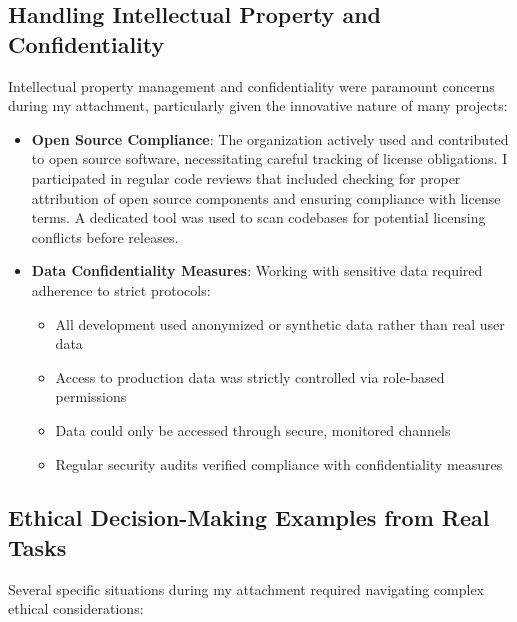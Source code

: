\documentclass[12pt,a4paper]{article}
\begin{document}
\subsection{Handling Intellectual Property and Confidentiality}

Intellectual property management and confidentiality were paramount concerns during my attachment, particularly given the innovative nature of many projects:

\begin{itemize}
    
    \item \textbf{Open Source Compliance}: The organization actively used and contributed to open source software, necessitating careful tracking of license obligations. I participated in regular code reviews that included checking for proper attribution of open source components and ensuring compliance with license terms. A dedicated tool was used to scan codebases for potential licensing conflicts before releases.
    
    \item \textbf{Data Confidentiality Measures}: Working with sensitive data required adherence to strict protocols:
    \begin{itemize}
        \item All development used anonymized or synthetic data rather than real user data
        \item Access to production data was strictly controlled via role-based permissions
        \item Data could only be accessed through secure, monitored channels
        \item Regular security audits verified compliance with confidentiality measures
    \end{itemize}
    
\end{itemize}

\subsection{Ethical Decision-Making Examples from Real Tasks}

Several specific situations during my attachment required navigating complex ethical considerations:
\end{document}
